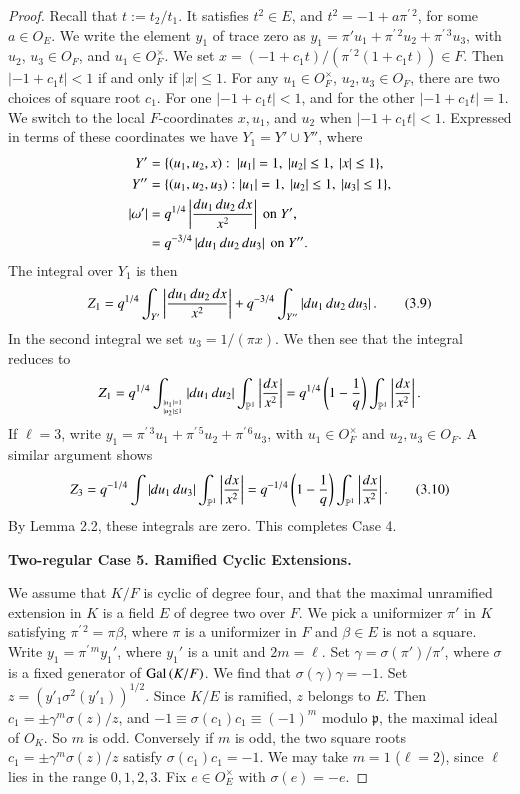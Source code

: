\documentclass{amsart}
\newcommand\bP{{\mathbb P}}
\newcommand\pp{{\mathfrak p}}
\newcommand\leftd[1]{\left | {d#1\over #1^2}\right |}
\newcommand\leftdx{\leftd x}
\newcommand\Gal{\hbox{Gal\,}}
\begin{document}
\begin{proof}
Recall that $t:=t_2/t_1$.  It satisfies $t^2\in E$, and $t^2 =
-1+a\pi^{\prime\,2}$, for some $a\in O_E$.  We write
the element $y_1$ of trace zero as
$y_1 = \pi'u_1 + \pi^{\prime\,2} u_2 + \pi^{\prime\,3} u_3$,
with $u_2$, $u_3\in O_F$, and $u_1\in O_F^\times$.
We set $x= (-1+c_1 t)/(\pi^{\prime\,2}(1+c_1 t))\in F$.
Then $|-1+c_1 t|<1$ if and only if $|x|\le 1$.  
For any $u_1\in O_F^\times$, $u_2,u_3\in O_F$, there are two choices of
square root $c_1$.  For one $|-1 + c_1 t| < 1$, and for the
other $|-1 + c_1 t| = 1$.
We switch to the local $F$-coordinates $x,u_1$, and $u_2$
when $|-1+c_1 t|<1$.
Expressed in terms of these coordinates we have $Y_1=Y'\cup Y''$,
where
\begin{align*}
Y' &= \{(u_1,u_2,x): \ |u_1|=1,\ |u_2|\le 1,\ |x|\le 1\},\ \\
Y'' &= \{(u_1,u_2,u_3):|u_1|=1,\ |u_2|\le 1,\ |u_3|\le 1\},\\
|\omega'| &= q^{1/4} \left|{du_1\, du_2\, dx\over x^2}\right|
						\text{ on } Y',\\ 
    &=q^{-3/4}\left|du_1\,du_2\,du_3\right| \text{ on } Y''.
\end{align*}
%
%
The integral over $Y_1$ is then
\begin{equation}
Z_1 = q^{1/4}\int_{Y'} \left | {du_1\, du_2\, dx \over x^2}\right |
+ q^{-3/4}\int_{Y''} \left | du_1\, du_2\, du_3 \right |.
\tag{3.9}
\end{equation}
In the second integral we set $u_3 = 1/(\pi x)$.  We
then see that the integral reduces to
$$Z_1=q^{1/4} \int_{|u_1|=1\atop |u_2|\le 1} 
\left| du_1\, du_2\right | \int_{\bP^1} 
\left | dx\over x^2\right | = q^{1/4} \left( 1-{1\over q}\right)
\int_{\bP^1} \leftdx.$$
If $\ell=3$, write $y_1 = \pi^{\prime\,3} u_1 + \pi^{\prime\,5}u_2
+\pi^{\prime\,6} u_3$, with $u_1\in O_F^\times$ and $u_2, u_3\in O_F$.
A similar argument shows
\begin{equation}
Z_3 = q^{-1/4}\int |du_1\,du_3| \int_{\bP^1}\leftdx =
q^{-1/4}\left(1-{1\over q}\right )\int_{\bP^1}\leftdx.
\tag{3.10}
\end{equation}
By Lemma 2.2, these integrals are zero.  This completes Case 4.

\bigskip
\centerline{\bf Two-regular Case 5. Ramified Cyclic Extensions.}
\bigskip

We assume that $K/F$ is cyclic of degree four, and that
the maximal unramified extension in $K$ is a field
$E$ of degree two over $F$.
We pick a uniformizer $\pi'$ in $K$ satisfying $\pi^{\prime\,2}
 =\pi\beta$,
where $\pi$ is a uniformizer in $F$ and $\beta\in E$ is not
a square.
Write $y_1 = \pi^{\prime\,m}y_1'$, where $y_1'$ is a
unit and $2m=\ell$.  Set $\gamma = \sigma(\pi')/\pi'$, where $\sigma$
is a fixed generator of $\Gal(K/F)$.  We find that
$\sigma(\gamma)\gamma = -1$.  Set $z = (y'_1\sigma^2(y'_1))^{1/2}$.
Since $K/E$ is ramified, $z$ belongs to $E$.  Then
$c_1 = \pm \gamma^m \sigma(z)/z$, and
$-1 \equiv \sigma(c_1)c_1\equiv (-1)^m$ modulo $\pp$,
the maximal ideal of $O_K$.  So $m$ is odd.
Conversely if $m$ is odd, the two square roots
$c_1 = \pm \gamma^m \sigma(z)/z$ satisfy $\sigma(c_1)c_1 = -1$.
We may take $m=1$ ($\ell=2$), since $\ell$ lies in the range
$0,1,2,3$.  Fix $e\in O_E^\times$ with $\sigma(e)=-e$.


\end{proof}
\end{document}
